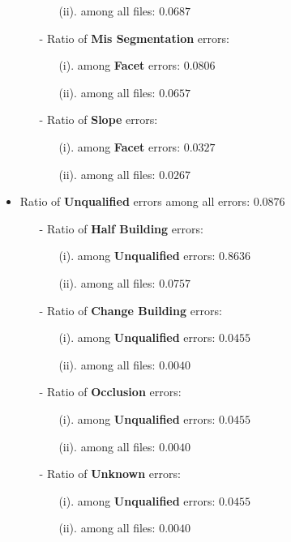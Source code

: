 \documentclass[a4paper, 11pt]{article}
\begin{document}
\begin{itemize}
\begin{itemize}
\begin{itemize}
				\item[(ii).] among all files:   $0.0687$
			\end{itemize}
			\item[-] Ratio of \textbf{Mis Segmentation} errors:
			\begin{itemize}
				\item[(i).] among \textbf{Facet} errors:  $0.0806$
				\item[(ii).] among all files:  $0.0657$
			\end{itemize}
			\item[-] Ratio of \textbf{Slope} errors:
			\begin{itemize}
				\item[(i).] among \textbf{Facet} errors:  $0.0327$
				\item[(ii).] among all files:  $0.0267$
			\end{itemize}
		\end{itemize}
		\item Ratio of \textbf{Unqualified} errors among all errors: $0.0876$
		\begin{itemize}
			\item[-] Ratio of \textbf{Half Building} errors:
			\begin{itemize}
				\item[(i).] among \textbf{Unqualified} errors:  $0.8636$
				\item[(ii).] among all files:  $0.0757$
			\end{itemize}
			\item[-] Ratio of \textbf{Change Building} errors:
			\begin{itemize}
				\item[(i).] among \textbf{Unqualified} errors:  $0.0455$
				\item[(ii).] among all files:   $0.0040$
			\end{itemize}
			\item[-] Ratio of \textbf{Occlusion} errors:
			\begin{itemize}
				\item[(i).] among \textbf{Unqualified} errors:  $0.0455$
				\item[(ii).] among all files:  $0.0040$
			\end{itemize}
			\item[-] Ratio of \textbf{Unknown} errors:
			\begin{itemize}
				\item[(i).] among \textbf{Unqualified} errors:   $0.0455$
				\item[(ii).] among all files:  $0.0040$
			\end{itemize}
		\end{itemize}
	\end{itemize}
\end{document}
